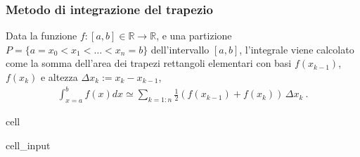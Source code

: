 \documentclass[letterpaper,10pt,english]{jupyterBook}
\begin{document}
\subsubsection{Metodo di integrazione del trapezio}
\label{\detokenize{ch/numerics/integrals:metodo-di-integrazione-del-trapezio}}
\sphinxAtStartPar
Data la funzione \(f:[a,b] \in \mathbb{R} \rightarrow \mathbb{R}\), e una partizione \(P = \{ a = x_0 < x_1 < \dots < x_n = b \}\) dell’intervallo \([a,b]\), l’integrale viene calcolato come la somma dell’area dei trapezi rettangoli elementari con basi \(f(x_{k-1})\), \(f(x_k)\) e altezza \(\Delta x_k := x_k - x_{k-1}\),
\begin{equation*}
\begin{split}\int_{x=a}^{b} f(x) dx \simeq \sum_{k=1:n} \frac{1}{2} \left( f(x_{k-1}) + f(x_k) \right) \, \Delta x_k \ . \end{split}
\end{equation*}
\begin{sphinxuseclass}{cell}\begin{sphinxVerbatimInput}

\begin{sphinxuseclass}{cell_input}
\begin{sphinxVerbatim}[commandchars=\\\{\}]

    
                  \PYG{p}{[}\PYG{p}{]}  
      \PYG{p}{[}\PYG{p}{]}  \PYG{p}{[}\PYG{p}{]}

           \PYG{p}{[}\PYG{p}{]}  \PYG{p}{[}\PYG{p}{]}  
    
\end{sphinxVerbatim}

\end{sphinxuseclass}\end{sphinxVerbatimInput}

\end{sphinxuseclass}
\end{document}
